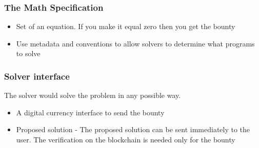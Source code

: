 \documentclass{beamer}
\begin{document}
\begin{frame}
  \frametitle{The Math Specification}
  \begin{itemize}
    \item Set of an equation.  If you make it equal zero then you get
      the bounty
    \item Use metadata and conventions to allow solvers to determine
      what programs to solve
   \end{itemize}
\begin{frame}
  \frametitle{Solver interface}
The solver would solve the problem in any possible way.
  \begin{itemize}
  \item A digital currency interface to send the bounty
  \item Proposed solution - The proposed solution can be sent
    immediately to the user.  The verification on the blockchain is
    needed only for the bounty
  \end{itemize}
\end{frame}
\end{frame}
\end{document}
